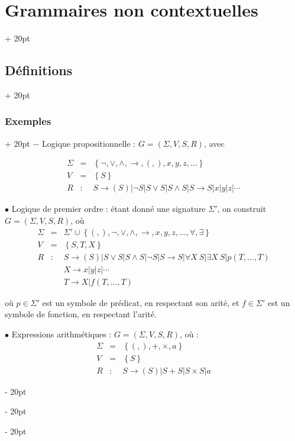 \documentclass[a4paper, 12pt, twoside]{article}
\newcommand{\lr}[1]{\left( #1 \right)}
\newcommand{\set}[1]{\left\{ #1 \right\}}
\newcommand{\ind}[1][20pt]{\advance\leftskip + #1}
\newcommand{\deind}[1][20pt]{\advance\leftskip - #1}
\newenvironment{indt}[2][20pt]{#2 \par \ind[#1]}{\par \deind} %
\begin{document}
\begin{indt}{\section{Grammaires non contextuelles}}
\begin{indt}{\subsection{Définitions}}
\begin{indt}{\subsubsection{Exemples}}
                $-$ Logique propositionnelle : $G = \lr{\Sigma, V, S, R}$, avec

                \[
                    \begin{array}{rcl}
                        \Sigma &=& \set{\neg, \vee, \wedge, \rightarrow, (, ), x, y, z, \ldots}
                        \\
                        V &=& \set S
                        \\
                        R &:& S \rightarrow (S) | \neg S | S \vee S | S \wedge S | S \rightarrow S | x | y | z | \cdots
                    \end{array}
                \]

                \vspace{12pt}
                
                $\bullet$ Logique de premier ordre : étant donné une signature $\Sigma'$, on construit $G = \lr{\Sigma, V, S, R}$, où
                \[
                    \begin{array}{rcl}
                        \Sigma &=& \Sigma' \cup \set{(, ), \neg, \vee, \wedge, \rightarrow, x, y, z, \ldots, \forall, \exists}
                        \\
                        V &=& \set{S, T, X}
                        \\
                        R &:& S \rightarrow (S) | S \vee S | S \wedge S | \neg S | S \rightarrow S | \forall X\ S | \exists X \ S | p(T, \ldots, T)
                        \\
                          && X \rightarrow x | y | z | \cdots
                        \\
                          && T \rightarrow X | f(T, \ldots, T)
                    \end{array}
                \]

                où $p \in \Sigma'$ est un symbole de prédicat, en respectant son arité, et $f \in \Sigma'$ est un symbole de fonction, en respectant l'arité.

                \vspace{12pt}
                
                $\bullet$ Expressions arithmétiques : $G = \lr{\Sigma, V, S, R}$, où :
                \[
                    \begin{array}{rcl}
                        \Sigma &=& \set{(, ), +, \times, a}
                        \\
                        V &=& \set{S}
                        \\
                        R &:& S \rightarrow (S) | S + S | S \times S | a
                    \end{array}
                \]
            \end{indt}


\end{indt}
\end{indt}
\end{document}
